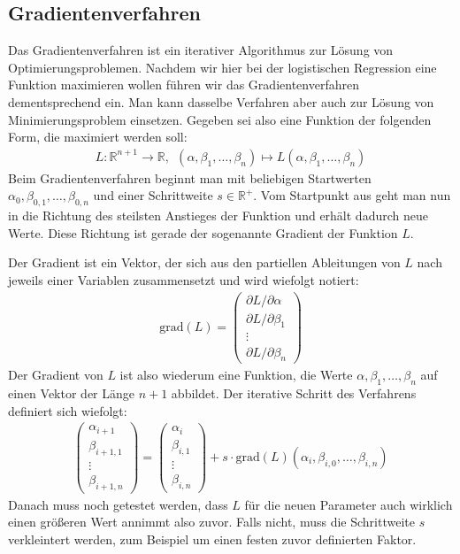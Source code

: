 \subsection{Gradientenverfahren}

Das Gradientenverfahren ist ein iterativer Algorithmus zur Lösung von Optimierungsproblemen. Nachdem wir hier bei der logistischen Regression eine Funktion maximieren wollen führen wir das Gradientenverfahren dementsprechend ein. Man kann dasselbe Verfahren aber auch zur Lösung von Minimierungsproblem einsetzen. Gegeben sei also eine Funktion der folgenden Form, die maximiert werden soll:
\begin{align*}
    L: \mathbb{R}^{n+1} \rightarrow \mathbb{R},~~ (\alpha, \beta_1, \dots, \beta_n) \mapsto L(\alpha, \beta_1, \dots, \beta_n)
\end{align*}
Beim Gradientenverfahren beginnt man mit beliebigen Startwerten $\alpha_0, \beta_{0, 1}, \dots, \beta_{0, n}$ und einer Schrittweite $s \in \mathbb{R}^+$. Vom Startpunkt aus geht man nun in die Richtung des steilsten Anstieges der Funktion und erhält dadurch neue Werte. Diese Richtung ist gerade der sogenannte Gradient der Funktion $L$.

Der Gradient ist ein Vektor, der sich aus den partiellen Ableitungen von $L$ nach jeweils einer Variablen zusammensetzt und wird wiefolgt notiert:
\begin{align*}
    \text{grad}(L) = \begin{pmatrix}
        \partial L / \partial \alpha \\
        \partial L / \partial \beta_1 \\
        \vdots \\
        \partial L / \partial \beta_n
    \end{pmatrix}
\end{align*}
Der Gradient von $L$ ist also wiederum eine Funktion, die Werte $\alpha, \beta_1, \dots, \beta_n$ auf einen Vektor der Länge $n+1$ abbildet. Der iterative Schritt des Verfahrens definiert sich wiefolgt:
\begin{align*}
    \begin{pmatrix}
        \alpha_{i + 1} \\
        \beta_{i + 1, 1} \\
        \vdots \\
        \beta_{i + 1, n}
    \end{pmatrix} = \begin{pmatrix}
        \alpha_i \\
        \beta_{i, 1} \\
        \vdots \\
        \beta_{i, n}
    \end{pmatrix} + s \cdot \text{grad}(L) (\alpha_i, \beta_{i, 0}, \dots, \beta_{i, n})
\end{align*}
Danach muss noch getestet werden, dass $L$ für die neuen Parameter auch wirklich einen größeren Wert annimmt also zuvor. Falls nicht, muss die Schrittweite $s$ verkleintert werden, zum Beispiel um einen festen zuvor definierten Faktor.

